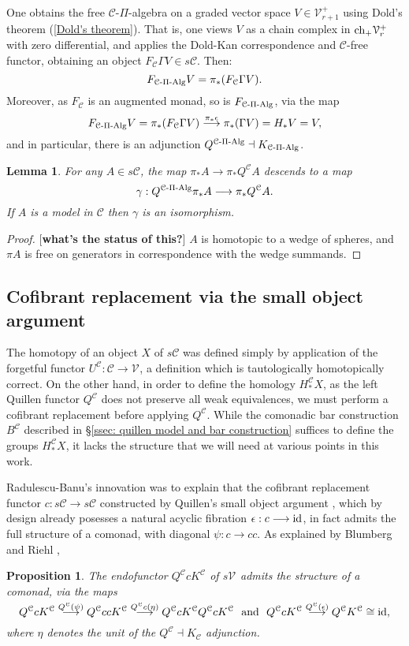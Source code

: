 \documentclass[11pt]{amsart}
\theoremstyle{plain}
\newtheorem{lem}[thm]{Lemma}
\newtheorem{prop}[thm]{Proposition}
\theoremstyle{definition}
\renewcommand{\to}{\longrightarrow}
\newcommand{\calC}{\mathcal{C}}
\newcommand{\calV}{\mathcal{V}}
\newcommand{\calc}{\mathcal{C}}
\theoremstyle{plain}
\newcommand{\vect}[2]{\calV^{#1}_{#2}}
\newcommand{\PiAlg}{\textup{-$\Pi$-Alg}}
\newcommand{\Id}{\textup{id}}
\newcommand{\complexes}{\textup{ch}_+}
\begin{document}
\begin{CPiAlgs and CHalgs}
One obtains the free $\calc$-$\Pi$-algebra on a graded vector space $V\in \vect{+}{r+1}$ using Dold's theorem (\ref{Dold's theorem}). That is, one views $V$ as a chain complex in $\complexes\vect{+}{r}$ with zero differential, and applies the Dold-Kan correspondence and $\calc$-free functor, obtaining an object $F_\calc\Gamma V\in s\calc$. Then:
\[F_{\calc\PiAlg}V=\pi_*(F_\calc\Gamma V).\]
Moreover, as $F_{\calc}$ is an augmented monad, so is $F_{\calc\PiAlg}$, via the map
\[F_{\calc\PiAlg}V=\pi_*(F_\calc\Gamma V)\overset{\pi_*\epsilon}{\to}\pi_*(\Gamma V)=H_*V=V,\]
and in particular, there is an adjunction $Q^{\calc\PiAlg}\dashv K_{\calc\PiAlg}$.
\begin{lem}
For any $A\in s\calC$, the map $\pi_*A\to \pi_*Q^\calc A$ descends to a map 
\[\gamma:Q^{\calC\PiAlg}\pi_* A\to \pi_* Q^{\calC}A.\]
If $A$ is a model in $\calc$ then $\gamma$ is an isomorphism.
\end{lem}
\begin{proof}{[\textbf{what's the status of this?}]} $A$ is homotopic to a wedge of spheres, and $\pi A$ is free on generators in correspondence with the wedge summands.
\end{proof}
\subsection{Cofibrant replacement via the small object argument}
The homotopy of an object $X$ of $s\calC$ was defined simply by application of the forgetful functor $U^{\calc}:\calc\to\vect{}{}$, a definition which is tautologically homotopically correct. On the other hand, in order to define the homology $H_*^{\calc}X$, as the left Quillen functor $Q^{\calc}$ does not preserve all weak equivalences, we must perform a cofibrant replacement before applying $Q^{\calc}$. While the comonadic bar construction $B^{\calc}$ described in \S\ref{ssec: quillen model and bar construction} suffices to define the groups $H_*^{\calc}X$, it lacks the structure that we will need at various points in this work.

Radulescu-Banu's innovation \cite{Radulescu-Banu.pdf} was to explain that the cofibrant replacement functor $c:s\calC\to s\calC$ constructed by Quillen's small object argument \cite{QuillenHomAlg.pdf}, which by design already posesses a natural acyclic fibration $\epsilon:c\to\Id$, in fact admits the full structure of a comonad, with diagonal $\psi:c\to cc$. As explained by Blumberg and Riehl \cite[Remark 4.12]{BlumRiehlResolutions.pdf},
\begin{prop}
The endofunctor $Q^\calc cK^\calc$ of $s\vect{}{}$ admits the structure of a comonad, via the maps
\[Q^\calc cK^\calc\overset{\smash{Q^\calc (\psi)}}{\to}Q^\calc ccK^\calc \overset{\smash{Q^\calc c(\eta)}}{\to} Q^\calc cK^\calc Q^\calc cK^\calc\text{ \ and \ }Q^\calc cK^\calc\overset{\smash{Q^\calc (\epsilon)}}{\to}Q^\calc K^\calc\cong\Id,\]
where $\eta$ denotes the unit of the $Q^\calC\dashv K_\calC$ adjunction.
\end{prop}


\end{CPiAlgs and CHalgs}
\end{document}
